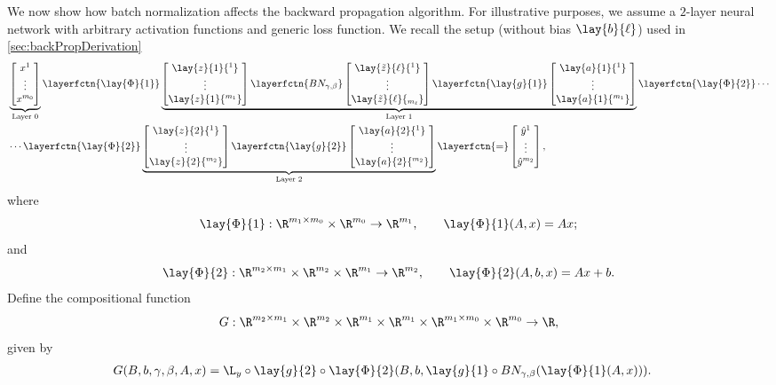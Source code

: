 We now show how batch normalization affects the backward propagation algorithm.  For illustrative purposes, we assume a $2$-layer neural network with arbitrary activation functions and generic loss function.  We recall the setup (without bias $\lay{b}{\ell}$) used in \cref{sec:backPropDerivation}
\begin{align*}
	&\underbrace{\begin{bmatrix}
		x^1\\
		\vdots\\
		x^{m_0}
		\end{bmatrix}}_{\text{Layer } 0}
	\layerfctn{\lay{\Phi}{1}}\underbrace{\begin{bmatrix}
			\lay{z}{1}{^1}\\
			\vdots\\
			\lay{z}{1}{^{m_1}}
			\end{bmatrix}
			\layerfctn{BN_{\gamma,\beta}}
		\begin{bmatrix}
			\lay{\tilde{z}}{\ell}{^1}\\
			\vdots\\
			\lay{\tilde{z}}{\ell}{_{m_\ell}}
		\end{bmatrix}
			\layerfctn{\lay{g}{1}}
			\begin{bmatrix}
			\lay{a}{1}{^1}\\
			\vdots\\
			\lay{a}{1}{^{m_1}}
			\end{bmatrix}}_{\text{Layer } 1}\layerfctn{\lay{\Phi}{2}}\cdots\\
	&\cdots\layerfctn{\lay{\Phi}{2}}
	\underbrace{\begin{bmatrix}
		\lay{z}{2}{^1}\\
		\vdots\\
		\lay{z}{2}{^{m_2}}
		\end{bmatrix}\layerfctn{\lay{g}{2}}
		\begin{bmatrix}
			\lay{a}{2}{^1}\\
			\vdots\\
			\lay{a}{2}{^{m_2}}
		\end{bmatrix}}_{\text{Layer } 2}\layerfctn{=}\begin{bmatrix}
		\hat{y}^1\\
		\vdots\\
		\hat{y}^{m_2}
	\end{bmatrix},
\end{align*}
where
$$\lay{\Phi}{1}:\R^{m_1\times m_0}\times\R^{m_0}\to\R^{m_1},\qquad\lay{\Phi}{1}(A,x)=Ax;$$
and
$$\lay{\Phi}{2}:\R^{m_2\times m_1}\times\R^{m_2}\times\R^{m_1}\to\R^{m_2},\qquad\lay{\Phi}{2}(A,b,x)=Ax+b.$$
Define the compositional function
$$G:\R^{m_2\times m_1}\times\R^{m_2}\times\R^{m_1}\times\R^{m_1}\times\R^{m_1\times m_0}\times\R^{m_0}\to\R,$$
given by
\begin{align*}
	G(B,b,\gamma,\beta,A,x)&=\L_y\circ\lay{g}{2}\circ\lay{\Phi}{2}(B,b,\lay{g}{1}\circ BN_{\gamma,\beta}(\lay{\Phi}{1}(A,x))).
\end{align*}

